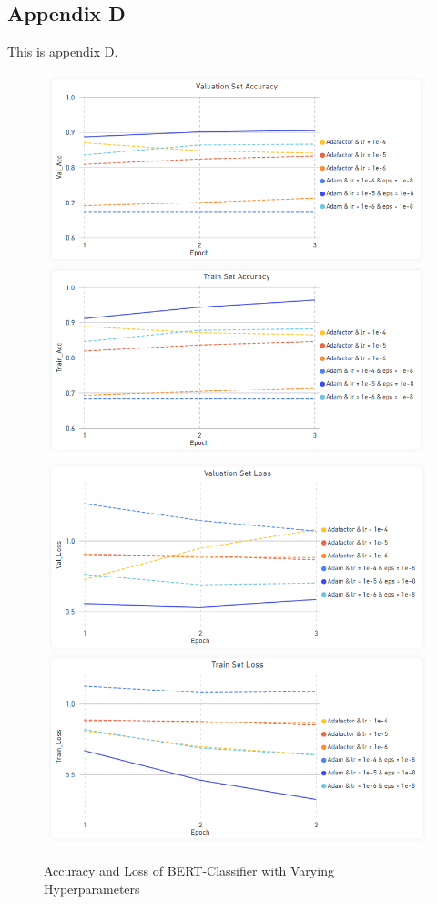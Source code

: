 \documentclass[11pt, a4paper]{article}
\begin{document}
\pagebreak
\subsection{Appendix D}
This is appendix D.
\label{appendix:BERT_Sentiment_Classifier}
\begin{figure}[!htb]
    \centering
    \includegraphics[scale=0.43]{BERT_Accuracy.png}
    \includegraphics[scale=0.43]{BERT_Loss.png}
    \caption{Accuracy and Loss of BERT-Classifier with Varying Hyperparameters}
    \label{fig:bert_acc_loss}
\end{figure}
\end{document}
